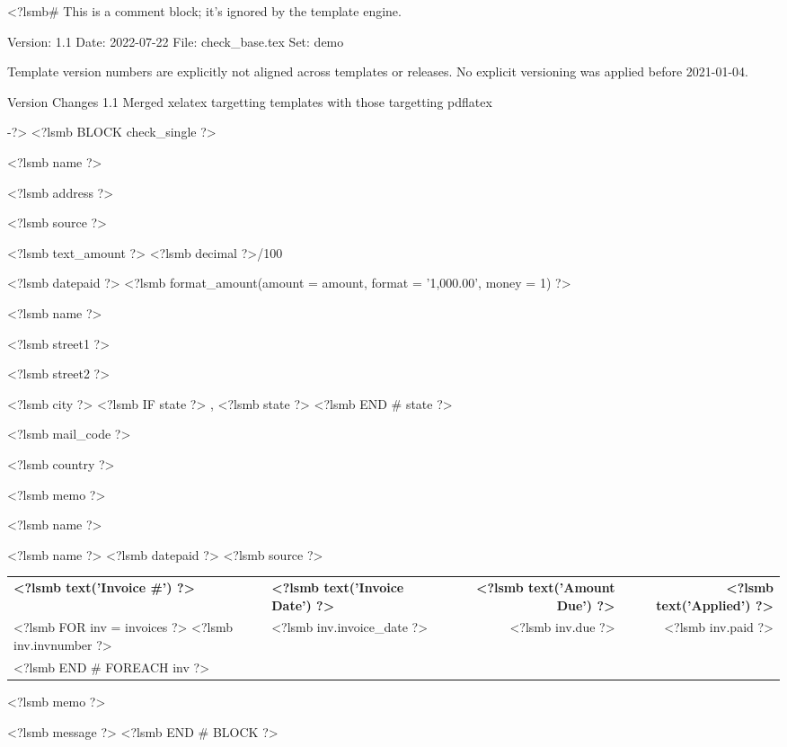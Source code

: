 <?lsmb#   This is a comment block; it's ignored by the template engine.

   Version:  1.1
   Date:     2022-07-22
   File:     check_base.tex
   Set:      demo

Template version numbers are explicitly not aligned across templates or
releases. No explicit versioning was applied before 2021-01-04.

Version   Changes
1.1       Merged xelatex targetting templates with those targetting pdflatex

-?>
<?lsmb BLOCK check_single ?>
\parbox[t]{12cm}{
  <?lsmb name ?>

  <?lsmb address ?>}
\hfill
\parbox[t]{6cm}{\hfill <?lsmb source ?>}

\vspace*{0.6cm}

<?lsmb text_amount ?> \dotfill <?lsmb decimal ?>/100 \makebox[0.5cm]{\hfill}

\vspace{0.5cm}

\hfill <?lsmb datepaid ?> \makebox[2cm]{\hfill} <?lsmb 
format_amount({amount = amount, format = '1,000.00', money = 1}) ?>


\vspace{0.5cm}

<?lsmb name ?>

<?lsmb street1 ?>

<?lsmb street2 ?>

<?lsmb city ?>
<?lsmb IF state ?>
\hspace{-0.1cm}, <?lsmb state ?>
<?lsmb END # state ?>

<?lsmb mail_code ?>

<?lsmb country ?>

\vspace{1.8cm}

<?lsmb memo ?>

\vspace{0.8cm}

<?lsmb name ?>

\vspace{0.5cm}

<?lsmb name ?> \hfill <?lsmb datepaid ?> \hfill <?lsmb source ?>

\vspace{0.5cm}
\begin{tabularx}{\textwidth}{lXrr@{}}
\textbf{<?lsmb text('Invoice #') ?>} & \textbf{<?lsmb text('Invoice Date') ?>}
  & \textbf{<?lsmb text('Amount Due') ?>} & \textbf{<?lsmb text('Applied') ?>} \\
<?lsmb FOR inv = invoices ?>
<?lsmb inv.invnumber ?> & <?lsmb inv.invoice_date ?> \dotfill
  & <?lsmb inv.due ?> & <?lsmb inv.paid ?> \\
<?lsmb END # FOREACH inv ?>
\end{tabularx}

\vspace{1cm}

<?lsmb memo ?>

\vfill
<?lsmb message ?>
<?lsmb END # BLOCK ?>
